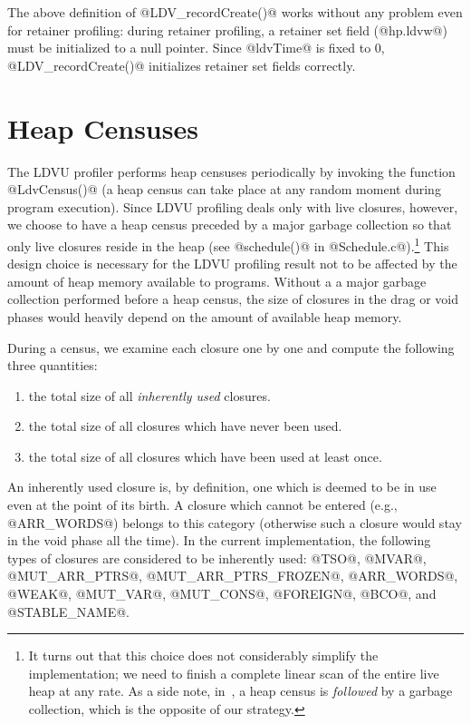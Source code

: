 \documentclass{article}
\begin{document}
The above definition of @LDV_recordCreate()@ works without any problem
even for retainer profiling: during retainer profiling, 
a retainer set field (@hp.ldvw@) must be initialized to a null pointer.
Since @ldvTime@ is fixed to $0$, @LDV_recordCreate()@ initializes 
retainer set fields correctly.

\section{Heap Censuses}
\label{sec-heap-censuses}

The LDVU profiler performs heap censuses periodically by invoking the
function @LdvCensus()@
(a heap census can take place at any random moment during program execution).
Since LDVU profiling deals only with live closures, however, we choose to have
a heap census preceded by a major garbage collection so that only live
closures reside in the heap 
(see @schedule()@ in @Schedule.c@).\footnote{It turns out that this
choice does not considerably simplify the implementation; we need to
finish a complete linear scan of the entire live heap at any rate. 
As a side note, in~\cite{RR}, a heap census is \emph{followed} by a garbage
collection, which is the opposite of our strategy.}
This design choice is necessary for the LDVU profiling result not to be 
affected by the amount of heap memory available to programs.
Without a a major garbage collection performed before a heap census,
the size of closures in the drag or void phases would heavily depend on
the amount of available heap memory. 

During a census, we examine each closure one by one and compute the following
three quantities:

\begin{enumerate}
\item the total size of all \emph{inherently used} closures.
\item the total size of all closures which have never been used.
\item the total size of all closures which have been used at least once. 
\end{enumerate}

An inherently used closure is, by definition, one which is deemed to
be in use even at the point of its birth. A closure which cannot be
entered (e.g., @ARR_WORDS@) belongs to this category (otherwise
such a closure would stay in the void phase all the time).
In the current implementation, the following types of closures are 
considered to be inherently used:
@TSO@, @MVAR@, @MUT_ARR_PTRS@, @MUT_ARR_PTRS_FROZEN@, @ARR_WORDS@,
@WEAK@, @MUT_VAR@, @MUT_CONS@, @FOREIGN@, @BCO@, and @STABLE_NAME@.
\end{document}
